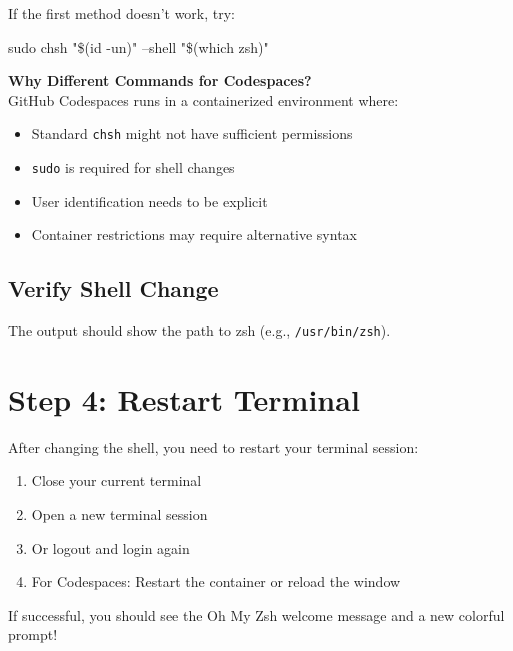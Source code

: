 \documentclass{article}
\begin{document}
If the first method doesn't work, try:

\begin{codebox}
sudo chsh "\$(id -un)" --shell "\$(which zsh)"
\end{codebox}

\begin{infobox}
\textbf{Why Different Commands for Codespaces?}\\
GitHub Codespaces runs in a containerized environment where:
\begin{itemize}
    \item Standard \texttt{chsh} might not have sufficient permissions
    \item \texttt{sudo} is required for shell changes
    \item User identification needs to be explicit
    \item Container restrictions may require alternative syntax
\end{itemize}
\end{infobox}

\subsection{Verify Shell Change}


The output should show the path to zsh (e.g., \texttt{/usr/bin/zsh}).

\section{Step 4: Restart Terminal}

After changing the shell, you need to restart your terminal session:

\begin{enumerate}
    \item Close your current terminal
    \item Open a new terminal session
    \item Or logout and login again
    \item For Codespaces: Restart the container or reload the window
\end{enumerate}

\begin{successbox}
If successful, you should see the Oh My Zsh welcome message and a new colorful prompt!
\end{successbox}
\end{document}
